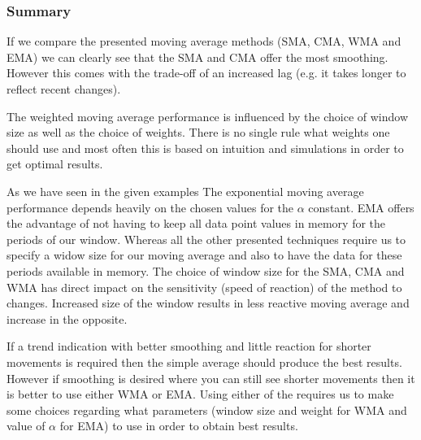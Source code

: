 \subsubsection{Summary}
If we compare the presented moving average methods (SMA, CMA, WMA and EMA) we can clearly see that the SMA and CMA offer the most smoothing. However this comes with the trade-off of an increased lag (e.g. it takes longer to reflect recent changes). 

The weighted moving average performance is influenced by the choice of window size as well as the choice of weights. There is no single rule what weights one should use and most often this is based on intuition and simulations in order to get optimal results.

As we have seen in the given examples The exponential moving average performance depends heavily on the chosen values for the $\alpha$ constant. EMA offers the advantage of not having to keep all data point values in memory for the periods of our window. Whereas all the other presented techniques require us to specify a widow size for our moving average and also to have the data for these periods available in memory. The choice of window size for the SMA, CMA and WMA has direct impact on the sensitivity (speed of reaction) of the method to changes. Increased size of the window results in less reactive moving average and increase in the opposite.

If a trend indication with better smoothing and little reaction for shorter movements is required then the simple average should produce the best results. However if smoothing is desired where you can still see shorter movements then it is better to use either WMA or EMA. Using either of the requires us to make some choices regarding what parameters (window size and weight for WMA and value of $\alpha$ for EMA) to use in order to obtain best results.


